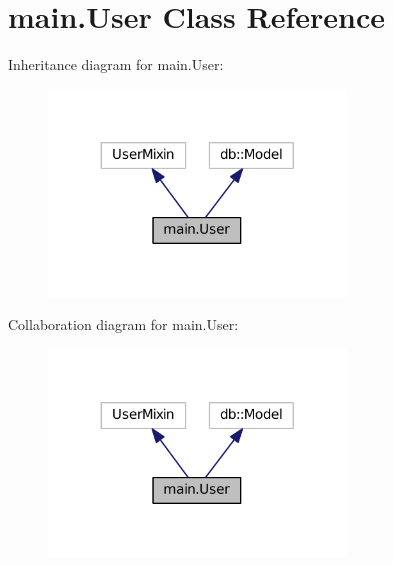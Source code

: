 \hypertarget{classmain_1_1User}{}\section{main.\+User Class Reference}
\label{classmain_1_1User}


Inheritance diagram for main.\+User\+:\nopagebreak
\begin{figure}[H]
\begin{center}
\leavevmode
\includegraphics[width=224pt]{classmain_1_1User__inherit__graph}
\end{center}
\end{figure}


Collaboration diagram for main.\+User\+:\nopagebreak
\begin{figure}[H]
\begin{center}
\leavevmode
\includegraphics[width=224pt]{classmain_1_1User__coll__graph}
\end{center}
\end{figure}
